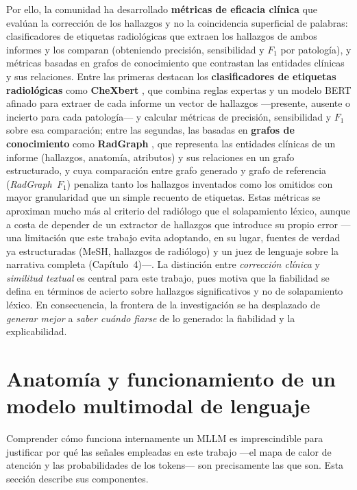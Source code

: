 Por ello, la comunidad ha desarrollado \textbf{métricas de eficacia clínica} que evalúan la
corrección de los hallazgos y no la coincidencia superficial de palabras: clasificadores de
etiquetas radiológicas que extraen los hallazgos de ambos informes y los comparan (obteniendo
precisión, sensibilidad y $F_1$ por patología), y métricas basadas en grafos de conocimiento que
contrastan las entidades clínicas y sus relaciones. Entre las primeras destacan los
\textbf{clasificadores de etiquetas radiológicas} como \textbf{CheXbert} \parencite{smit2020chexbert},
que combina reglas expertas y un modelo BERT afinado para extraer de cada informe un vector de
hallazgos —presente, ausente o incierto para cada patología— y calcular métricas de precisión,
sensibilidad y $F_1$ sobre esa comparación; entre las segundas, las basadas en \textbf{grafos de
conocimiento} como \textbf{RadGraph} \parencite{jain2021radgraph}, que representa las entidades
clínicas de un informe (hallazgos, anatomía, atributos) y sus relaciones en un grafo estructurado, y
cuya comparación entre grafo generado y grafo de referencia (\textit{RadGraph~$F_1$}) penaliza tanto
los hallazgos inventados como los omitidos con mayor granularidad que un simple recuento de
etiquetas. Estas métricas se aproximan mucho más al criterio del radiólogo que el solapamiento léxico,
aunque a costa de depender de un extractor de hallazgos que introduce su propio error —una limitación
que este trabajo evita adoptando, en su lugar, fuentes de verdad ya estructuradas (MeSH, hallazgos de
radiólogo) y un juez de lenguaje sobre la narrativa completa (Capítulo~4)—. La distinción
entre \emph{corrección clínica} y
\emph{similitud textual} es central para este trabajo, pues motiva que la fiabilidad se defina en
términos de acierto sobre hallazgos significativos y no de solapamiento léxico. En consecuencia, la
frontera de la investigación se ha desplazado de \emph{generar mejor} a \emph{saber cuándo fiarse} de
lo generado: la fiabilidad y la explicabilidad.

\section{Anatomía y funcionamiento de un modelo multimodal de lenguaje}
Comprender cómo funciona internamente un MLLM es imprescindible para justificar por qué las señales
empleadas en este trabajo —el mapa de calor de atención y las probabilidades de los tokens— son
precisamente las que son. Esta sección describe sus componentes.

